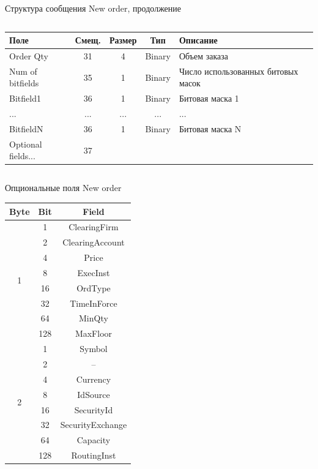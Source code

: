 \documentclass[unknownkeysallowed,xcolor=table]{beamer}
\begin{document}
\begin{frame}{Структура сообщения New order, продолжение}

\begin{columns}
\column{\dimexpr\paperwidth-10pt}
\begin{center}
\begin{tabular}{ |m{5em}|c c c |m{10em}| }
  \hline
    Поле & Смещ. & Размер & Тип & Описание \\
  \hline
    Order Qty & 31 & 4 & Binary & Объем заказа \\[4pt]
    Num of bitfields & 35 & 1 & Binary & Число использованных битовых масок \\[4pt]
    Bitfield1 & 36 & 1 & Binary & Битовая маска 1 \\[4pt]
    ... & ... & ... & ... & ... \\
    BitfieldN & 36 & 1 & Binary & Битовая маска N \\[4pt]
    Optional fields... & 37 & & & \\
  \hline
\end{tabular}
\end{center}
\end{columns}

\end{frame}

\begin{frame}{Опциональные поля New order}

\begin{center}
\begin{tabular}{ |c|c|c| }
  \hline
    Byte & Bit  & Field \\
  \hline
    \multirow{8}{*}{1} & 1 & ClearingFirm \\
      & 2 & ClearingAccount \\
      & 4 & Price \\
      & 8 & ExecInst \\
      & 16 & OrdType \\
      & 32 & TimeInForce \\
      & 64 & MinQty \\
      & 128 & MaxFloor \\
    \hline
    \multirow{8}{*}{2} & 1 & Symbol \\
      & 2 & -- \\
      & 4 & Currency \\
      & 8 & IdSource \\
      & 16 & SecurityId \\
      & 32 & SecurityExchange \\
      & 64 & Capacity \\
      & 128 & RoutingInst \\
  \hline
\end{tabular}
\end{center}

\end{frame}
\end{document}
